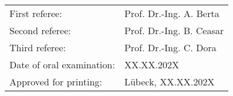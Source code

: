 	{
		\setlength\parindent{0pt}	%
		\large
		\,\vfill			%
				
		\begin{tabular}{ll}
			First referee:				&	Prof. Dr.-Ing. A. Berta	\\
			Second referee:				&	Prof. Dr.-Ing. B. Ceasar		\\
			Third referee:				&	Prof. Dr.-Ing. C. Dora		\\[8pt]
			Date of oral examination:	&	XX.XX.202X						\\[8pt]
			Approved for printing:		&	Lübeck, XX.XX.202X				\\
		\end{tabular}
		
	}

\newpage